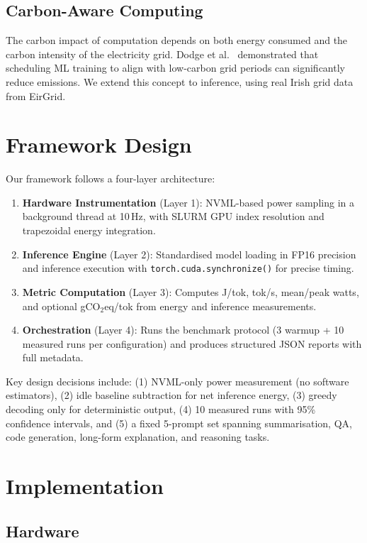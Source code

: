 \documentclass[conference]{IEEEtran}
\begin{document}
\subsection{Carbon-Aware Computing}

The carbon impact of computation depends on both energy consumed and the carbon intensity of the electricity grid. Dodge et al.~\cite{dodge2022measuring} demonstrated that scheduling ML training to align with low-carbon grid periods can significantly reduce emissions. We extend this concept to inference, using real Irish grid data from EirGrid.

\section{Framework Design}

Our framework follows a four-layer architecture:

\begin{enumerate}
    \item \textbf{Hardware Instrumentation} (Layer 1): NVML-based power sampling in a background thread at 10\,Hz, with SLURM GPU index resolution and trapezoidal energy integration.
    \item \textbf{Inference Engine} (Layer 2): Standardised model loading in FP16 precision and inference execution with \texttt{torch.cuda.synchronize()} for precise timing.
    \item \textbf{Metric Computation} (Layer 3): Computes J/tok, tok/s, mean/peak watts, and optional gCO$_2$eq/tok from energy and inference measurements.
    \item \textbf{Orchestration} (Layer 4): Runs the benchmark protocol (3 warmup + 10 measured runs per configuration) and produces structured JSON reports with full metadata.
\end{enumerate}

Key design decisions include: (1) NVML-only power measurement (no software estimators), (2) idle baseline subtraction for net inference energy, (3) greedy decoding only for deterministic output, (4) 10 measured runs with 95\% confidence intervals, and (5) a fixed 5-prompt set spanning summarisation, QA, code generation, long-form explanation, and reasoning tasks.

\section{Implementation}

\subsection{Hardware}
\end{document}
